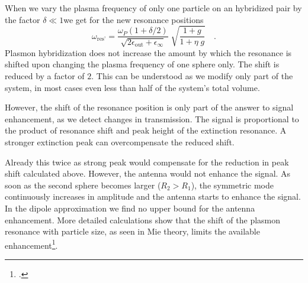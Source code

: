 When we vary the plasma frequency of only one particle on an hybridized pair by the factor
$\delta \ll 1$we get for the  new
resonance positions
%
\begin{equation}  
 \omega_{\text{res'}} = \frac{\omega_P (1 + \delta / 2)}{\sqrt{2 \epsilon_{\text{out}}+ \epsilon_{\infty}} }
 \; \sqrt{ \frac{1 + g}{ 1 +  \eta \; g}} \quad .
\end{equation}
Plasmon hybridization does not increase the amount by which the resonance is
shifted upon changing the plasma frequency of one sphere only. The shift is reduced by a factor of $2$. This can be understood
as we modify only part of the system,  in most cases even less than half of the
system's total volume.


However, the shift of the resonance position is only part of the answer to
signal enhancement, as we detect changes in transmission. The signal is
proportional to the product of resonance shift and peak height of the extinction
resonance. A stronger extinction peak can overcompensate the reduced shift. 

Already this twice as strong peak would compensate for the
reduction in peak shift calculated above. However, the antenna would not
enhance the signal. As soon as the second sphere becomes larger ($R_2 > R_1$),
the symmetric mode continuously increases in amplitude and the antenna starts to
enhance the signal. In the dipole approximation we find  no upper bound for the
antenna enhancement. More detailed calculations show that the shift of the plasmon resonance with particle size, as seen in Mie theory, limits the available enhancement\footcite{Schumacher16}. 





\printbibliography[segment=\therefsegment,heading=subbibliography]
